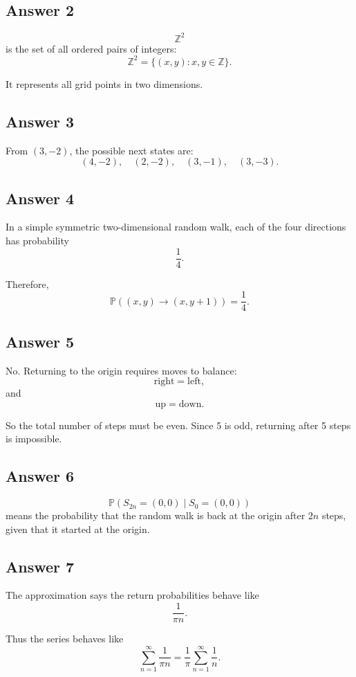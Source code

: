\documentclass[12pt,a4paper]{article}
\theoremstyle{notestyle}
\newcommand{\Prob}{\mathbb{P}}
\begin{document}
\subsection*{Answer 2}

\[
\mathbb{Z}^2
\]
is the set of all ordered pairs of integers:
\[
\mathbb{Z}^2=\{(x,y):x,y\in\mathbb{Z}\}.
\]

It represents all grid points in two dimensions.

\subsection*{Answer 3}

From $(3,-2)$, the possible next states are:
\[
(4,-2),\quad (2,-2),\quad (3,-1),\quad (3,-3).
\]

\subsection*{Answer 4}

In a simple symmetric two-dimensional random walk, each of the four directions has probability
\[
\frac14.
\]

Therefore,
\[
\Prob((x,y)\to(x,y+1))=\frac14.
\]

\subsection*{Answer 5}

No. Returning to the origin requires moves to balance:
\[
\text{right}=\text{left},
\]
and
\[
\text{up}=\text{down}.
\]

So the total number of steps must be even. Since 5 is odd, returning after 5 steps is impossible.

\subsection*{Answer 6}

\[
\Prob(S_{2n}=(0,0)\mid S_0=(0,0))
\]
means the probability that the random walk is back at the origin after $2n$ steps, given that it started at the origin.

\subsection*{Answer 7}

The approximation says the return probabilities behave like
\[
\frac1{\pi n}.
\]

Thus the series behaves like
\[
\sum_{n=1}^{\infty}\frac1{\pi n}
=
\frac1{\pi}\sum_{n=1}^{\infty}\frac1n.
\]
\end{document}
